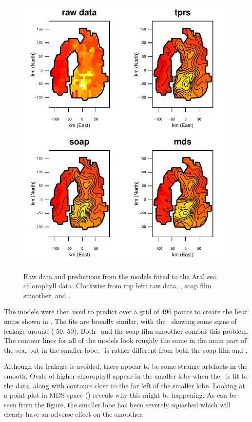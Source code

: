 {\begin{figure}
\centering
\includegraphics{mds/figs/aral-fit.pdf} \\
\caption{Raw data and predictions from the models fitted to the Aral sea chlorophyll data. Clockwise from top left: raw data, \tprs, soap film smoother, and \mdsap.}
\label{aral-fit}
\end{figure}

The models were then used to predict over a grid of 496 points to create the heat maps shown in . The fits are broadly similar, with the \tprs\ showing some signs of leakage around (-50,-50). Both \mdsap\ and the soap film smoother combat this problem. The contour lines for all of the models look roughly the same in the main part of the sea, but in the smaller lobe, \mdsap\ is rather different from both the soap film and \tprs. 

Although the leakage is avoided, there appear to be some strange artefacts in the smooth. Ovals of higher chlorophyll appear in the smaller lobe when the \mdsap\ is fit to the data, along with contours close to the far left of the smaller lobe. Looking at a point plot in MDS space () reveals why this might be happening. As can be seen from the figure, the smaller lobe has been severely squashed which will clearly have an adverse effect on the smoother.

}
